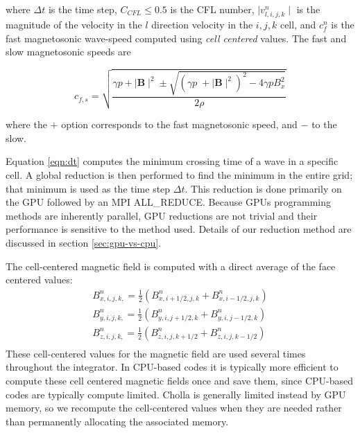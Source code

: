 \noindent where $\Delta t$ is the time step, $C_{CFL} \leq 0.5$ is the CFL number, $\mid v^n_{l,i,j,k}\mid $ is the magnitude of the velocity in the $l$ direction velocity in the ${i,j,k}$ cell, and $c^n_f $ is the fast magnetosonic wave-speed computed using \emph{cell centered} values. The fast and slow magnetosonic speeds are

\begin{equation}
    c_{f,s} = \sqrt{\frac
    {\gamma p + \mid \boldsymbol{B} \mid^2 \pm \sqrt{\left( \gamma p \;+ \mid \boldsymbol{B} \mid^2 \right)^2 - 4\gamma p B_x^2 } }
    {2\rho}}
\end{equation}

\noindent where the $+$ option corresponds to the fast magnetosonic speed, and $-$ to the slow.

Equation \ref{eqn:dt} computes the minimum crossing time of a wave in a specific cell. A global reduction is then performed to find the minimum in the entire grid; that minimum is used as the time step $\Delta t$. This reduction is done primarily on the GPU followed by an MPI ALL\_REDUCE. Because GPUs programming methods are inherently parallel, GPU reductions are not trivial and their performance is sensitive to the method used. Details of our reduction method are discussed in section \ref{sec:gpu-vs-cpu}. 

The cell-centered magnetic field is computed with a direct average of the face centered values:
\begin{equation}
    \begin{aligned}
        B^n_{x,i,j,k,} = \frac{1}{2} \left( B^n_{x,i+1/2,j,k} + B^n_{x,i-1/2,j,k} \right) \\
        B^n_{y,i,j,k,} = \frac{1}{2} \left( B^n_{y,i,j+1/2,k} + B^n_{y,i,j-1/2,k} \right) \\
        B^n_{z,i,j,k,} = \frac{1}{2} \left( B^n_{z,i,j,k+1/2} + B^n_{z,i,j,k-1/2} \right) \\
    \end{aligned}
\end{equation}
These cell-centered values for the magnetic field are used several times throughout the integrator. In CPU-based codes it is typically more efficient to compute these cell centered magnetic fields once and save them, since CPU-based codes are typically compute limited. Cholla is generally limited instead by GPU memory, so we recompute the cell-centered values when they are needed rather than permanently allocating the associated memory.



